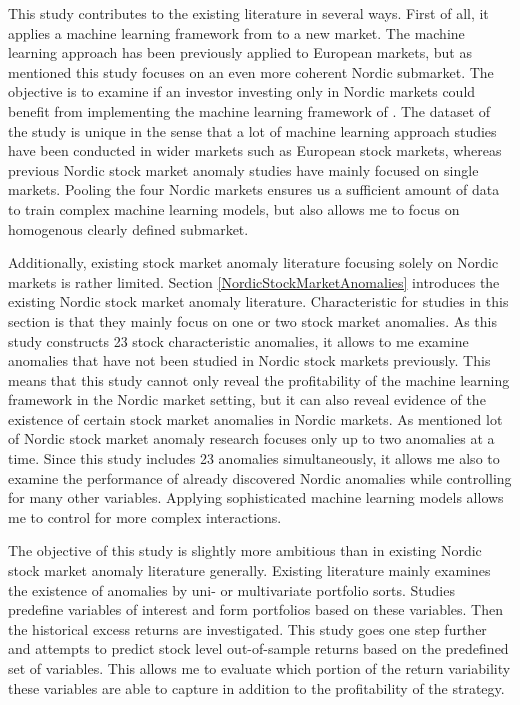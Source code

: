 \documentclass[12pt]{article}
\begin{document}
This study contributes to the existing literature in several ways. First of all, it applies a machine learning framework from \citet{guetal} to a new market.\footnotemark {} The machine learning approach has been previously applied to European markets, but as mentioned this study focuses on an even more coherent Nordic submarket.\footnotemark {} The objective is to examine if an investor investing only in Nordic markets could benefit from implementing the machine learning framework of \citet{guetal}. The dataset of the study is unique in the sense that a lot of machine learning approach studies have been conducted in wider markets such as European stock markets, whereas previous Nordic stock market anomaly studies have mainly focused on single markets. Pooling the four Nordic markets ensures us a sufficient amount of data to train complex machine learning models, but also allows me to focus on homogenous clearly defined submarket. \par

Additionally, existing stock market anomaly literature focusing solely on Nordic markets is rather limited. Section \ref{NordicStockMarketAnomalies} introduces the existing Nordic stock market anomaly literature. Characteristic for studies in this section is that they mainly focus on one or two stock market anomalies. As this study constructs 23 stock characteristic anomalies, it allows to me examine anomalies that have not been studied in Nordic stock markets previously. This means that this study cannot only reveal the profitability of the machine learning framework in the Nordic market setting, but it can also reveal evidence of the existence of certain stock market anomalies in Nordic markets. As mentioned lot of Nordic stock market anomaly research focuses only up to two anomalies at a time. Since this study includes 23 anomalies simultaneously, it allows me also to examine the performance of already discovered Nordic anomalies while controlling for many other variables. Applying sophisticated machine learning models allows me to control for more complex interactions. \par

The objective of this study is slightly more ambitious than in existing Nordic stock market anomaly literature generally. Existing literature mainly examines the existence of anomalies by uni- or multivariate portfolio sorts. Studies predefine variables of interest and form portfolios based on these variables. Then the historical excess returns are investigated. This study goes one step further and attempts to predict stock level out-of-sample returns based on the predefined set of variables. This allows me to evaluate which portion of the return variability these variables are able to capture in addition to the profitability of the strategy. \par
\end{document}
